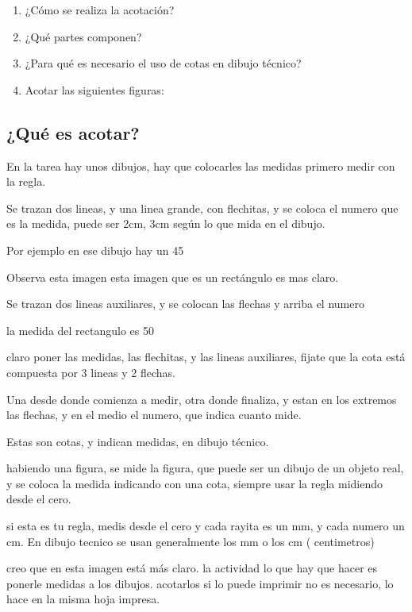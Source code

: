 \documentclass[../main]{subfiles}
\begin{document}
\newpage
{}
\begin{enumerate}
    \item ¿Cómo se realiza la acotación?
    \item ¿Qué partes componen?
    \item ¿Para qué es necesario el uso de cotas en dibujo técnico?
    \item Acotar las siguientes figuras:
\end{enumerate}

\newpage

\newpage

\subsection{¿Qué es acotar?}

En la tarea hay unos dibujos, hay que colocarles las medidas primero medir con la regla.

Se trazan dos lineas, y una linea grande, con flechitas, y se coloca el numero que es la medida, puede ser 2cm, 3cm según lo que mida en el dibujo.

Por ejemplo en ese dibujo hay un 45

Observa esta imagen esta imagen que es un rectángulo es mas claro.

 Se trazan dos lineas auxiliares, y se colocan las flechas y arriba el numero

 la medida del rectangulo es 50


 claro poner las medidas, las flechitas, y las lineas auxiliares, fijate que la cota está compuesta por 3 lineas y 2 flechas.

 Una desde donde comienza a medir, otra donde finaliza, y estan en los extremos las flechas, y en el medio el numero, que indica cuanto mide.

Estas son cotas, y indican medidas, en dibujo técnico.

habiendo una figura, se mide la figura, que puede ser un dibujo de un objeto real, y se coloca la medida indicando con una cota, siempre usar la regla midiendo desde el cero.

 si esta es tu regla, medis desde el cero y cada rayita es un mm, y cada numero un cm. En dibujo tecnico se usan generalmente los mm o los cm ( centimetros)

 creo que en esta imagen está más claro.
 la actividad lo que hay que hacer es ponerle medidas a los dibujos.
acotarlos
 si lo puede imprimir no es necesario, lo hace en la misma hoja impresa.
\end{document}
